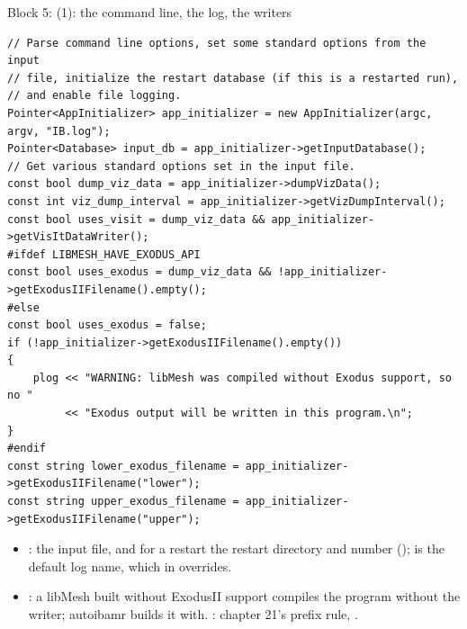 \documentclass[aspectratio=169,11pt]{beamer}
\begin{document}
\begin{frame}[fragile]{Block 5:  (1): the command line, the log, the writers}
\label{fr:appinit}
\begin{lstlisting}[style=cpptiny]
// Parse command line options, set some standard options from the input
// file, initialize the restart database (if this is a restarted run),
// and enable file logging.
Pointer<AppInitializer> app_initializer = new AppInitializer(argc, argv, "IB.log");
Pointer<Database> input_db = app_initializer->getInputDatabase();
// Get various standard options set in the input file.
const bool dump_viz_data = app_initializer->dumpVizData();
const int viz_dump_interval = app_initializer->getVizDumpInterval();
const bool uses_visit = dump_viz_data && app_initializer->getVisItDataWriter();
#ifdef LIBMESH_HAVE_EXODUS_API
const bool uses_exodus = dump_viz_data && !app_initializer->getExodusIIFilename().empty();
#else
const bool uses_exodus = false;
if (!app_initializer->getExodusIIFilename().empty())
{
    plog << "WARNING: libMesh was compiled without Exodus support, so no "
         << "Exodus output will be written in this program.\n";
}
#endif
const string lower_exodus_filename = app_initializer->getExodusIIFilename("lower");
const string upper_exodus_filename = app_initializer->getExodusIIFilename("upper");
\end{lstlisting}
\scriptsize
\begin{itemize}
  \item {}: the input file, and for a restart the restart directory and number ();  is the default log name, which  in  overrides.
  \item {}: a libMesh built without ExodusII support compiles the program without the writer; autoibamr builds it with. : chapter 21's prefix rule, .
\end{itemize}
\end{frame}
\end{document}
